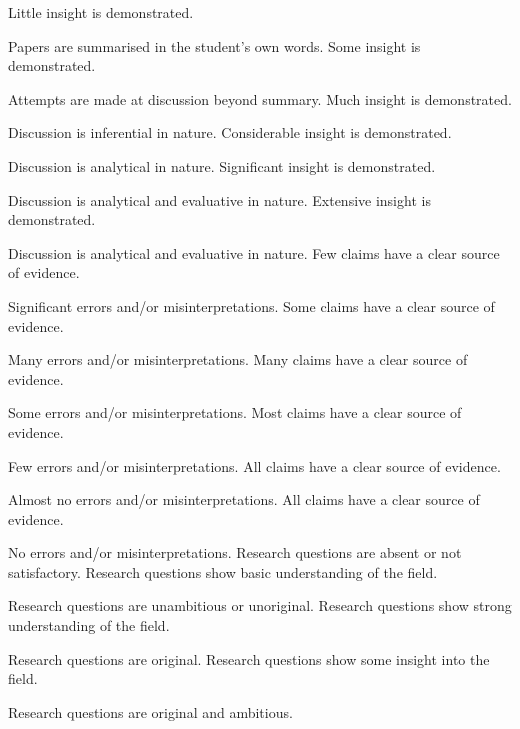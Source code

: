 \begin{markingrubric}
        \grade\fail 	Little insight is demonstrated.
        \par		Papers are summarised in the student's own words.
        \grade		Some insight is demonstrated.
        \par		Attempts are made at discussion beyond summary.
        \grade		Much insight is demonstrated.
        \par		Discussion is inferential in nature.
        \grade		Considerable insight is demonstrated.
        \par		Discussion is analytical in nature.
        \grade		Significant insight is demonstrated.
        \par		Discussion is analytical and evaluative in nature.
        \grade		Extensive insight is demonstrated.
        \par		Discussion is analytical and evaluative in nature.
        \grade\fail 	Few claims have a clear source of evidence.
        \par 		Significant errors and/or misinterpretations.
        \grade 		Some claims have a clear source of evidence.
        \par 		Many errors and/or misinterpretations.
        \grade 		Many claims have a clear source of evidence.
        \par 		Some errors and/or misinterpretations.
        \grade 		Most claims have a clear source of evidence.
        \par 		Few errors and/or misinterpretations.
        \grade 		All claims have a clear source of evidence.
        \par 		Almost no errors and/or misinterpretations.
        \grade 		All claims have a clear source of evidence.
        \par 		No errors and/or misinterpretations.
        \grade\fail 	Research questions are absent or not satisfactory.
        \grade 		Research questions show basic understanding of the field.
        \par		Research questions are unambitious or unoriginal.
        \grade 		Research questions show strong understanding of the field.
        \par		Research questions are original.
        \grade 		Research questions show some insight into the field.
        \par		Research questions are original and ambitious.

\end{markingrubric}

